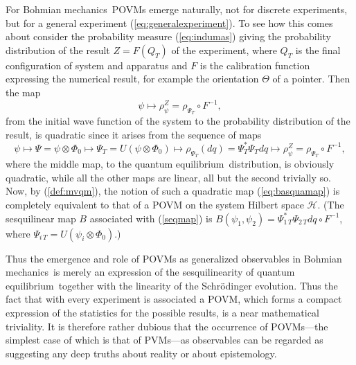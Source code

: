 \documentclass[12pt]{article}
\newcommand{\eq}[1]{(\ref{#1})}
\newcommand{\Sc}{Schr\"{o}dinger}
\newcommand{\BM}{Bohmian mechanics}
\newcommand{\wf}{wave function}
\newcommand{\qe}{quantum equilibrium}
\renewcommand{\H}{\mbox{$\mathcal{H}$}}
\begin{document}
For \BM\ POVMs emerge naturally, not for discrete experiments, but for
a general experiment (\ref{eq:generalexperiment}).  To see how this
comes about consider the probability measure (\ref{eq:indumas}) giving
the probability distribution of the result ${Z}= F(Q_T)$ of the
experiment, where $Q_T$ is the final configuration of system and
apparatus and $F$ is the calibration function expressing the numerical
result, for example the orientation $\Theta$ of a pointer. Then the
map
\begin{equation}
\psi \mapsto \rho^{Z}_{\psi}  = \rho_{\Psi_{T}} \circ F^{-1},
\label{eq:basquamap}
\end{equation}
{}from the initial \wf{} of the system to the probability distribution
of the result, is quadratic since it arises {}from the sequence of
maps
\begin{equation}
\psi \mapsto
\Psi = \psi \otimes \Phi_0 \mapsto
   \Psi_T = U( \psi \otimes \Phi_0) \mapsto \rho_{\Psi_{T}}(dq) =
\Psi_T^{*} \Psi_T dq
\mapsto \rho^{Z}_{\psi} = \rho_{\Psi_{T}} \circ F^{-1},
\label{seqmap}
\end{equation}
where the middle map, to the \qe\ distribution, is obviously
quadratic, while all the other maps are linear, all but the second
trivially so.  Now, by (\ref{def:mvqm}), the notion of such a
quadratic map (\ref{eq:basquamap}) is completely equivalent to that of
a POVM on the system Hilbert space \H{}.  (The sesquilinear map $B$
associated with \eq{seqmap} is $B(\psi_1,\psi_2)= \Psi_{1\,T}^{*}
\Psi_{2\,T} dq \circ F^{-1}$, where $\Psi_{i\,T}= U (\psi_i \otimes
\Phi_0)$.)

Thus the emergence and role of POVMs as generalized observables in
\BM\ is merely an expression of the sesquilinearity of \qe\ together
with the linearity of the \Sc{} evolution.  Thus the fact that with
every experiment is associated a POVM, which forms a compact
expression of the statistics for the possible results, is a near
mathematical triviality.  It is therefore rather dubious that the
occurrence of POVMs---the simplest case of which is that of PVMs---as
observables can be regarded as suggesting any deep truths about
reality or about epistemology.  \bigskip
\end{document}
